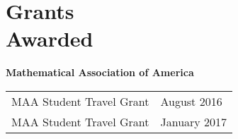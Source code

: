 \section{\sc Grants\\ Awarded}
{\bf{Mathematical Association of America}}\\
\begin{tabular}{@{}p{4in}p{2in}}
MAA Student Travel Grant & August 2016\\
MAA Student Travel Grant & January 2017
\end{tabular}
\endinput
